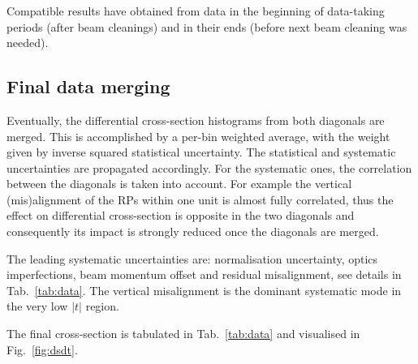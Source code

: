\subsubsection{}

Compatible results have obtained from data in the beginning of data-taking periods (after beam cleanings) and in their ends (before next beam cleaning was needed). 


\subsection{Final data merging}

Eventually, the differential cross-section histograms from both diagonals are merged. This is accomplished by a per-bin weighted average, with the weight given by inverse squared statistical uncertainty. The statistical and systematic uncertainties are propagated accordingly. For the systematic ones, the correlation between the diagonals is taken into account. For example the vertical (mis)alignment of the RPs within one unit is almost fully correlated, thus the effect on differential cross-section is opposite in the two diagonals and consequently its impact is strongly reduced once the diagonals are merged.

The leading systematic uncertainties are: normalisation uncertainty, optics imperfections, beam momentum offset and residual misalignment, see details in Tab.~\ref{tab:data}. The vertical misalignment is the dominant systematic mode in the very low $|t|$ region.

The final cross-section is tabulated in Tab.~\ref{tab:data} and visualised in Fig.~\ref{fig:dsdt}.





